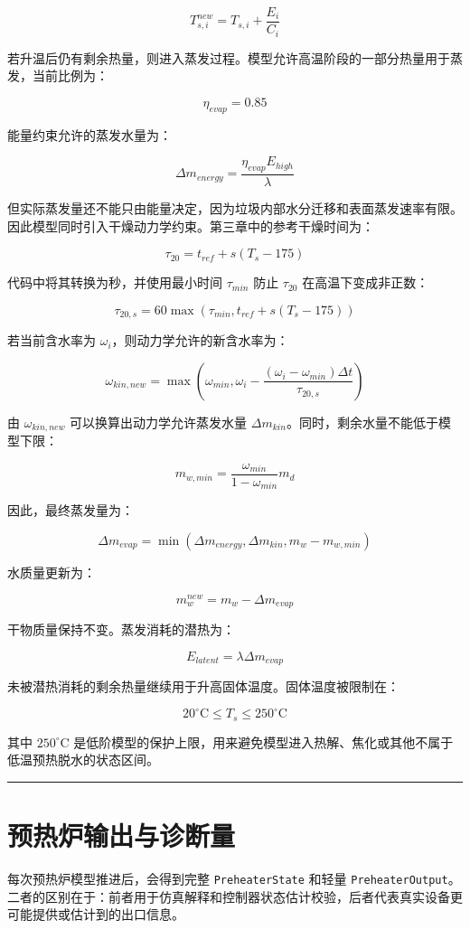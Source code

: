 \documentclass[UTF8,openany,zihao=-4,oneside]{ctexbook}
\providecommand{\passthrough}[1]{#1}
\newcommand{\manualdivider}{\par\vspace{0.6em}\noindent\textcolor{FGLine}{\rule{\linewidth}{0.7pt}}\vspace{0.6em}\par}
\begin{document}
\[
T_{s,i}^{new}=T_{s,i}+\frac{E_i}{C_i}
\]

若升温后仍有剩余热量，则进入蒸发过程。模型允许高温阶段的一部分热量用于蒸发，当前比例为：

\[
\eta_{evap}=0.85
\]

能量约束允许的蒸发水量为：

\[
\Delta m_{energy}=\frac{\eta_{evap}E_{high}}{\lambda}
\]

但实际蒸发量还不能只由能量决定，因为垃圾内部水分迁移和表面蒸发速率有限。因此模型同时引入干燥动力学约束。第三章中的参考干燥时间为：

\[
\tau_{20}=t_{ref}+s(T_s-175)
\]

代码中将其转换为秒，并使用最小时间 \(\tau_{min}\) 防止 \(\tau_{20}\) 在高温下变成非正数：

\[
\tau_{20,s}=60\max(\tau_{min},t_{ref}+s(T_s-175))
\]

若当前含水率为 \(\omega_i\)，则动力学允许的新含水率为：

\[
\omega_{kin,new}
=
\max\left(
\omega_{min},
\omega_i-\frac{(\omega_i-\omega_{min})\Delta t}{\tau_{20,s}}
\right)
\]

由 \(\omega_{kin,new}\) 可以换算出动力学允许蒸发水量 \(\Delta m_{kin}\)。同时，剩余水量不能低于模型下限：

\[
m_{w,min}=\frac{\omega_{min}}{1-\omega_{min}}m_d
\]

因此，最终蒸发量为：

\[
\Delta m_{evap}
=
\min(\Delta m_{energy},\Delta m_{kin},m_w-m_{w,min})
\]

水质量更新为：

\[
m_w^{new}=m_w-\Delta m_{evap}
\]

干物质量保持不变。蒸发消耗的潜热为：

\[
E_{latent}=\lambda\Delta m_{evap}
\]

未被潜热消耗的剩余热量继续用于升高固体温度。固体温度被限制在：

\[
20^\circ\mathrm{C}\le T_s\le250^\circ\mathrm{C}
\]

其中 \(250^\circ\mathrm{C}\) 是低阶模型的保护上限，用来避免模型进入热解、焦化或其他不属于低温预热脱水的状态区间。

\manualdivider

\section{预热炉输出与诊断量}\label{ux9884ux70edux7089ux8f93ux51faux4e0eux8bcaux65adux91cf}

每次预热炉模型推进后，会得到完整 \passthrough{\lstinline!PreheaterState!} 和轻量 \passthrough{\lstinline!PreheaterOutput!}。二者的区别在于：前者用于仿真解释和控制器状态估计校验，后者代表真实设备更可能提供或估计到的出口信息。
\end{document}
